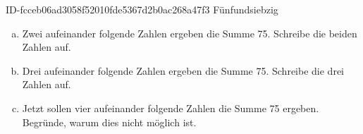 \begin{exercise}
      {ID-fcceb06ad3058f52010fde5367d2b0ac268a47f3}
      {Fünfundsiebzig}
  \ifproblem\problem\par
    \begin{enumerate}[a)]
      \item Zwei aufeinander folgende Zahlen ergeben die Summe 75.
            Schreibe die beiden Zahlen auf.
      \item Drei aufeinander folgende Zahlen ergeben die Summe 75.
            Schreibe die drei Zahlen auf.
      \item Jetzt sollen vier aufeinander folgende Zahlen die Summe 75 ergeben.
            Begründe, warum dies nicht möglich ist.
    \end{enumerate}
  \fi
\end{exercise}

